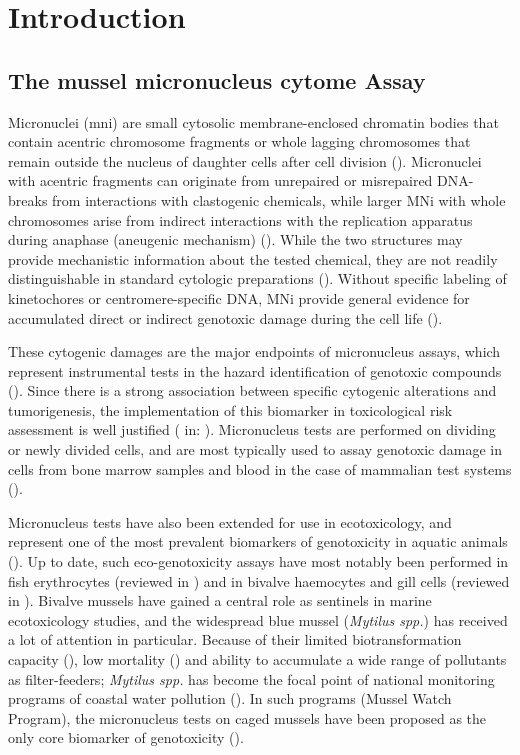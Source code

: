 \chapter{Introduction}
\section{The mussel micronucleus cytome Assay}
Micronuclei (\acrshort{mni}) are small cytosolic membrane-enclosed chromatin bodies that contain acentric chromosome fragments or whole lagging chromosomes that remain outside the nucleus of daughter cells after cell division (\cite{Fenech2011}). Micronuclei with acentric fragments can originate from unrepaired or misrepaired DNA-breaks from interactions with clastogenic chemicals, while larger MNi with whole chromosomes arise from indirect interactions with the replication apparatus during anaphase (aneugenic mechanism) (\cite{Fenech2011}). While the two structures may provide mechanistic information about the tested chemical, they are not readily distinguishable in standard cytologic preparations (\cite{Natarajan1993}). Without specific labeling of kinetochores or centromere-specific DNA, MNi provide general evidence for accumulated direct or indirect genotoxic damage during the cell life (\cite{Tucker1996, Lynch1993}).

These cytogenic damages are the major endpoints of micronucleus assays, which represent instrumental tests in the hazard identification of genotoxic compounds (\cite{OECD474, OECD487, USEPA1998}). Since there is a strong association between specific cytogenic alterations and tumorigenesis, the implementation of this biomarker in toxicological risk assessment is well justified (\cite{Mitelman1983} in: \cite{Tucker1996}). Micronucleus tests are performed on dividing or newly divided cells, and are most typically used to assay genotoxic damage in cells from bone marrow samples and blood in the case of mammalian test systems (\cite{Heddle1983, Warheit2018b}).

Micronucleus tests have also been extended for use in ecotoxicology, and represent one of the most prevalent biomarkers of genotoxicity in aquatic animals (\cite{Bolognesi2011}). Up to date, such eco-genotoxicity assays have most notably been performed in fish erythrocytes (reviewed in \cite{Agostini2021}) and in bivalve haemocytes and gill cells (reviewed in \cite{Bolognesi2014}). Bivalve mussels have gained a central role as sentinels in marine ecotoxicology studies, and the widespread blue mussel (\emph{Mytilus spp.}) has received a lot of attention in particular. Because of their limited biotransformation capacity (\cite{Beyer2017b}), low mortality (\cite{Ale2019, Costa2009}) and ability to accumulate a wide range of pollutants as filter-feeders; \emph{Mytilus spp.} has become the focal point of national monitoring programs of coastal water pollution (\cite{Goldberg1975, Beyer2017b, Cajarville2000}). In such programs (Mussel Watch Program), the micronucleus tests on caged mussels have been proposed as the only core biomarker of genotoxicity (\cite{Bolognesi2012}).

